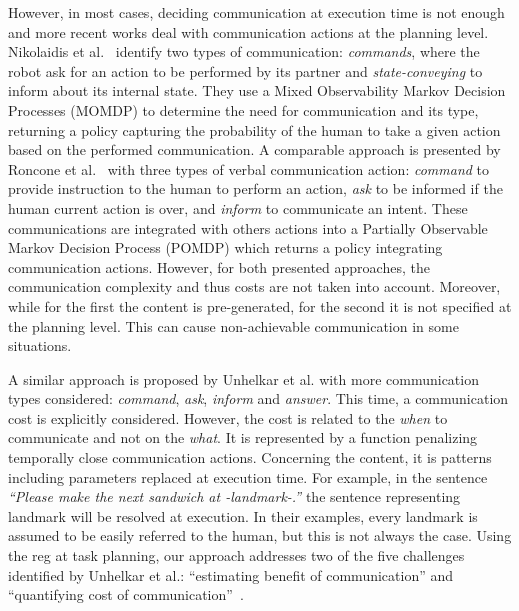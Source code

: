 However, in most cases, deciding communication at execution time is not enough and more recent works deal with communication actions at the planning level. Nikolaidis et al.~\cite{nikolaidis_2018_planning} identify two types of communication: \textit{commands}, where the robot ask for an action to be performed by its partner and \textit{state-conveying} to inform about its internal state. They use a Mixed Observability Markov Decision Processes (MOMDP) to determine the need for communication and its type, returning a policy capturing the probability of the human to take a given action based on the performed communication. A comparable approach is presented by Roncone et al.~\cite{roncone_2017_transparent} with three types of verbal communication action: \textit{command} to provide instruction to the human to perform an action, \textit{ask} to be informed if the human current action is over, and \textit{inform} to communicate an intent. These communications are integrated with others actions into a Partially Observable Markov Decision Process (POMDP) which returns a policy integrating communication actions. However, for both presented approaches, the communication complexity and thus costs are not taken into account. Moreover, while for the first the content is pre-generated, for the second it is not specified at the planning level. This can cause non-achievable communication in some situations.

A similar approach is proposed by Unhelkar et al. \cite{unhelkar_2020_decision} with more communication types considered: \textit{command}, \textit{ask}, \textit{inform} and \textit{answer}. This time, a communication cost is explicitly considered. However, the cost is related to the \textit{when} to communicate and not on the \textit{what}. It is represented by a function penalizing temporally close communication actions. Concerning the content, it is patterns including parameters replaced at execution time. For example, in the sentence \textit{“Please make the next sandwich at -landmark-.”} the sentence representing landmark will be resolved at execution. In their examples, every landmark is assumed to be easily referred to the human, but this is not always the case. Using the \acrshort{reg} at task planning, our approach addresses two of the five challenges identified by Unhelkar et al.: ``estimating benefit of communication'' and ``quantifying cost of communication''~\cite{unhelkar_2017_challenges}.

